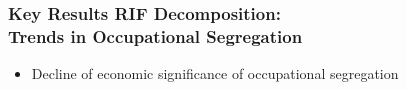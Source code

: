 \documentclass[10pt]{beamer}
\begin{document}










\begin{frame}[label=occ_spec] 
	\frametitle{Key Results RIF Decomposition: \\ Trends in  Occupational Segregation}
	
%	
	
\begin{itemize} 
	\item Decline of economic significance of occupational segregation
\end{itemize} 

	\hyperlink{regression}{}
		
\end{frame}
\end{document}
